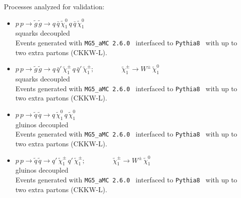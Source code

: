 \documentclass[10pt,fleqn]{article}
\begin{document}
\noindent Processes analyzed for validation: 
 \begin{itemize}
 \item $ p\, p \to \tilde{g}\, \tilde{g} \to q\, \bar{q}\, \tilde{\chi}_1^0\, q\, \bar{q}\, \tilde{\chi}_1^0$\\
 squarks decoupled\\
 Events generated with \texttt{MG5\_aMC 2.6.0}~\cite{Alwall:2014hca} interfaced to \texttt{Pythia8}~\cite{Sjostrand:2007gs} with up to two extra partons (CKKW-L).
 \item $ p\, p \to \tilde{g}\, \tilde{g} \to q\, \bar{q}'\,  \tilde{\chi}_1^\pm\, q\, \bar{q}'\, \tilde{\chi}_1^\pm; \qquad\qquad \tilde{\chi}_1^\pm \to W^\pm\,  \tilde{\chi}_1^0$\\
 squarks decoupled\\
 Events generated with \texttt{MG5\_aMC 2.6.0}~\cite{Alwall:2014hca} interfaced to \texttt{Pythia8}~\cite{Sjostrand:2007gs} with up to two extra partons (CKKW-L).
 \item $ p\, p \to \tilde{q}\, \tilde{q} \to q\,  \tilde{\chi}_1^0\, q\, \tilde{\chi}_1^0$\\
 gluinos decoupled\\
 Events generated with \texttt{MG5\_aMC 2.6.0}~\cite{Alwall:2014hca} interfaced to \texttt{Pythia8}~\cite{Sjostrand:2007gs} with up to two extra partons (CKKW-L).
 \item $ p\, p \to \tilde{q}\, \tilde{q} \to q'\,  \tilde{\chi}_1^\pm\, q'\, \tilde{\chi}_1^\pm; \qquad\qquad \tilde{\chi}_1^\pm \to W^\pm\,  \tilde{\chi}_1^0$\\
 gluinos decoupled\\
 Events generated with \texttt{MG5\_aMC 2.6.0}~\cite{Alwall:2014hca} interfaced to \texttt{Pythia8}~\cite{Sjostrand:2007gs} with up to two extra partons (CKKW-L).
 \end{itemize}


\newpage \thispagestyle{empty}
\end{document}
